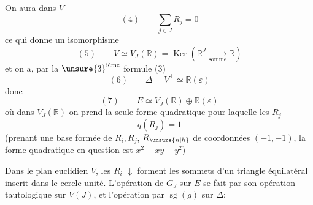 On aura dans $V$
\[
(4)\qquad\sum_{j\in J}R_j=0
\]
ce qui donne un isomorphisme
\[
(5)\qquad V\simeq V_J(\mathbb R)=\operatorname{Ker}(\mathbb R^J\xrightarrow[\text{somme}]{}\mathbb R)
\]
et on a, par la ${\unsure{3}}^{\text{ième}}$ formule (3)
\[
(6)\qquad\Delta=V^\perp\simeq\mathbb R(\varepsilon)
\]
donc
\[
(7)\qquad E\simeq V_J(\mathbb R)\oplus\mathbb R(\varepsilon)
\]
où dans $V_J(\mathbb R)$ on prend la seule forme quadratique  pour laquelle les $R_j$   
\[
q(R_j)=1
\]
(prenant une base formée de $R_i,R_j$, $R_{\unsure{n|h}}$ de coordonnées $(-1,-1)$, la forme quadratique en question est $x^2-xy+y^2$)

Dans le plan euclidien $V$, les $R_i$
\(\downarrow\)
forment les sommets d'un triangle équilatéral inscrit dans le cercle unité.
L'opération de $G_J$ sur $E$ se fait par son opération  tautologique sur $V(J)$, et l'opération par $\operatorname{sg}(g)$ sur $\Delta$:
